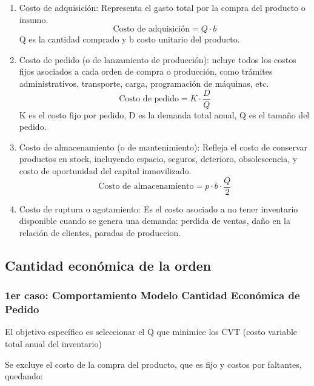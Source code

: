 \documentclass[a4paper,oneside,11pt]{article}
\begin{document}
\begin{enumerate}
    \item Costo de adquisición: Representa el gasto total por la compra del producto o insumo.
    \begin{equation}
        \text{Costo de adquisición} = Q \cdot b
    \end{equation}
    Q es la cantidad comprado y b costo unitario del producto.

    \item Costo de pedido (o de lanzamiento de producción): ncluye todos los costos fijos asociados a cada orden de compra o producción, como trámites administrativos, transporte, carga, programación de máquinas, etc.
    \begin{equation}
        \text{Costo de pedido} = K \cdot \dfrac{D}{Q}
    \end{equation}
    K es el costo fijo por pedido, D es la demanda total anual, Q es el tamaño del pedido.
    
    
    \item Costo de almacenamiento (o de mantenimiento): Refleja el costo de conservar productos en stock, incluyendo espacio, seguros, deterioro, obsolescencia, y costo de oportunidad del capital inmovilizado.
    \begin{equation}
        \text{Costo de almacenamiento} = p \cdot b \cdot \dfrac{Q}{2}
    \end{equation}
    

    \item Costo de ruptura o agotamiento: Es el costo asociado a no tener inventario disponible cuando se genera una demanda: perdida de ventas, daño en la relación de clientes, paradas de produccion.
    
\end{enumerate}

\subsection{Cantidad económica de la orden}

\subsubsection{1er caso: Comportamiento Modelo Cantidad Económica de Pedido }
El objetivo específico es seleccionar el Q que minimice los CVT (costo variable total anual del inventario)

Se excluye el costo de la compra del producto, que es fijo y costos por faltantes, quedando:
\end{document}
